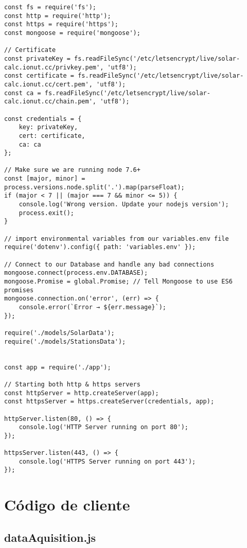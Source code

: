 \begin{lstlisting}[style=ES6, caption={Server/start.js}]
const fs = require('fs');
const http = require('http');
const https = require('https');
const mongoose = require('mongoose');

// Certificate
const privateKey = fs.readFileSync('/etc/letsencrypt/live/solar-calc.ionut.cc/privkey.pem', 'utf8');
const certificate = fs.readFileSync('/etc/letsencrypt/live/solar-calc.ionut.cc/cert.pem', 'utf8');
const ca = fs.readFileSync('/etc/letsencrypt/live/solar-calc.ionut.cc/chain.pem', 'utf8');

const credentials = {
	key: privateKey,
	cert: certificate,
	ca: ca
};

// Make sure we are running node 7.6+
const [major, minor] = process.versions.node.split('.').map(parseFloat);
if (major < 7 || (major === 7 && minor <= 5)) {
	console.log('Wrong version. Update your nodejs version');
	process.exit();
}

// import environmental variables from our variables.env file
require('dotenv').config({ path: 'variables.env' });

// Connect to our Database and handle any bad connections
mongoose.connect(process.env.DATABASE);
mongoose.Promise = global.Promise; // Tell Mongoose to use ES6 promises
mongoose.connection.on('error', (err) => {
	console.error(`Error → ${err.message}`);
});

require('./models/SolarData');
require('./models/StationsData');


const app = require('./app');

// Starting both http & https servers
const httpServer = http.createServer(app);
const httpsServer = https.createServer(credentials, app);

httpServer.listen(80, () => {
	console.log('HTTP Server running on port 80');
});

httpsServer.listen(443, () => {
	console.log('HTTPS Server running on port 443');
});
\end{lstlisting}

\section{Código de cliente}


\subsection{dataAquisition.js}

